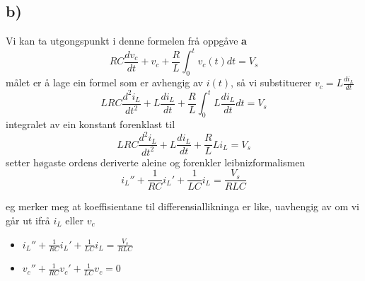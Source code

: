 \documentclass[12pt,a4paper]{article}
\begin{document}
    \subsection*{b)}
    Vi kan ta utgongspunkt i denne formelen frå oppgåve \textbf{a}
    \begin{equation}
      RC\frac{dv_c}{dt} + v_c + \frac{R}{L} \int_0^t v_c(t) dt = V_s
    \end{equation}
    målet er å lage ein formel som er avhengig av $i(t)$, så vi substituerer
    $v_c = L\frac{di_L}{dt}$
    \begin{equation}
      LRC\frac{d^2i_L}{dt^2} + L\frac{di_L}{dt} + \frac{R}{L}\int_0^t L\frac{di_L}{dt}dt = V_s
    \end{equation}
    integralet av ein konstant forenklast til
    \begin{equation}
      LRC\frac{d^2i_L}{dt^2} + L\frac{di_L}{dt} + \frac{R}{L}Li_L = V_s
    \end{equation}
    setter høgaste ordens deriverte aleine og forenkler leibnizformalismen
    \begin{equation}
      i_L'' + \frac{1}{RC}i_L' + \frac{1}{LC}i_L = \frac{V_s}{RLC}
    \end{equation}

    eg merker meg at koeffisientane til differensiallikninga er like,
    uavhengig av om vi går ut ifrå $i_L$ eller $v_c$
    \begin{itemize}
      \item $i_L'' + \frac{1}{RC}i_L' + \frac{1}{LC}i_L = \frac{V_s}{RLC}$
      \item $v_c'' + \frac{1}{RC}v_c' + \frac{1}{LC}v_c = 0$
    \end{itemize}
\end{document}
